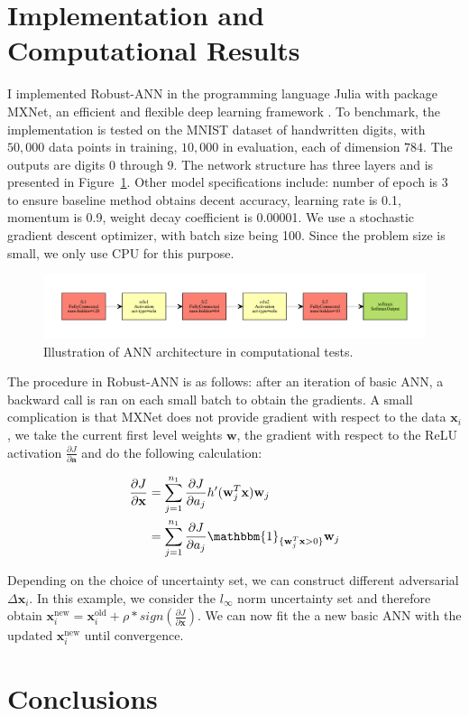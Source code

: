 \documentclass[twoside,12pt]{article}
\newcommand{\M}[1]{\boldsymbol{\mathbf{#1}}}
\begin{document}
\section{Implementation and Computational Results}
I implemented Robust-ANN in the programming language \textsf{Julia} with package \textsf{MXNet}, an efficient and flexible deep learning framework \cite{mxnet}. To benchmark, the implementation is tested on the MNIST dataset of handwritten digits, with $50,000$ data points in training, $10,000$ in evaluation, each of dimension $784$. The outputs are digits $0$ through $9$. The network structure has three layers and is presented in Figure~\ref{fig:ann_arc}. Other model specifications include: number of epoch is 3 to ensure baseline method obtains decent accuracy, learning rate is 0.1, momentum is 0.9, weight decay coefficient is 0.00001. We use a stochastic gradient descent optimizer, with batch size being 100. Since the problem size is small, we only use CPU for this purpose. 
\begin{figure}[ht!]
    \includegraphics[scale=0.7]{visualize.pdf}
    \caption{Illustration of ANN architecture in computational tests.}
    \label{fig:ann_arc}
\end{figure}



The procedure in Robust-ANN is as follows: after an iteration of basic ANN, a backward call is ran on each small batch to obtain the gradients. A small complication is that \textsf{MXNet} does not provide gradient with respect to the data $\M x_i$, we take the current first level weights $\M w$, the gradient with respect to the ReLU activation $\frac{\partial J}{\partial \M a}$ and do the following calculation:


\begin{equation}
\begin{aligned}
\frac{\partial J}{\partial \M x} 
& = \sum_{j=1}^{n_1} \frac{\partial J}{\partial a_j} h'(\M w_j^T \M x) \M w_j\\
& = \sum_{j=1}^{n_1} \frac{\partial J}{\partial a_j} \mathbbm{1}_{\{\M w_j^T \M x > 0 \} } \M w_j
\end{aligned}
\end{equation}

Depending on the choice of uncertainty set, we can construct different adversarial $\Delta \M x_i$. In this example, we consider the $l_\infty$ norm uncertainty set and therefore obtain $\M x_i^{\textrm{new}} = \M x_i^{\textrm{old}} + \rho * sign(\frac{\partial J}{\partial \M x})$. We can now fit the a new basic ANN with the updated $\M x_i^{\textrm{new}}$ until convergence.



\section{Conclusions}




\end{document}
